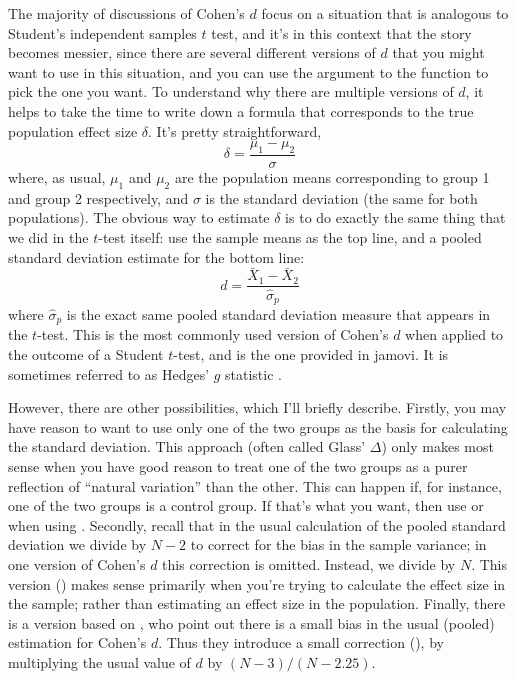 The majority of discussions of Cohen's $d$ focus on a situation that is analogous to Student's independent samples $t$ test, and it's in this context that the story becomes messier, since there are several different versions of $d$ that you might want to use in this situation, and you can use the  argument to the  function to pick the one you want. To understand why there are multiple versions of $d$, it helps to take the time to write down a formula that corresponds to the true population effect size $\delta$. It's pretty straightforward, 
$$
\delta = \frac{\mu_1 - \mu_2}{\sigma}
$$
where, as usual, $\mu_1$ and $\mu_2$ are the population means corresponding to group 1 and group 2 respectively, and $\sigma$ is the standard deviation (the same for both populations). The obvious way to estimate $\delta$ is to do exactly the same thing that we did in the $t$-test itself: use the sample means as the top line, and a pooled standard deviation estimate for the bottom line:
$$
d = \frac{\bar{X}_1 - \bar{X}_2}{\hat{\sigma}_p}
$$
where $\hat\sigma_p$ is the exact same pooled standard deviation measure that appears in the $t$-test. This is the most commonly used version of Cohen's $d$ when applied to the outcome of a Student $t$-test, and is the one provided in jamovi. It is sometimes referred to as Hedges' $g$ statistic \cite{Hedges1981}. 

However, there are other possibilities, which I'll briefly describe. Firstly, you may have reason to want to use only one of the two groups as the basis for calculating the standard deviation. This approach (often called Glass' $\Delta$) only makes most sense when you have good reason to treat one of the two groups as a purer reflection of ``natural variation'' than the other. This can happen if, for instance, one of the two groups is a control group. If that's what you want, then use  or  when using . Secondly, recall that in the usual calculation of the pooled standard deviation we divide by $N-2$ to correct for the bias in the sample variance; in one version of Cohen's $d$ this correction is omitted. Instead, we divide by $N$. This version () makes sense primarily when you're trying to calculate the effect size in the sample; rather than estimating an effect size in the population. Finally, there is a version based on , who point out there is a small bias in the usual (pooled) estimation for Cohen's $d$. Thus they introduce a small correction (), by multiplying the usual value of $d$ by $(N-3)/(N-2.25)$. 

